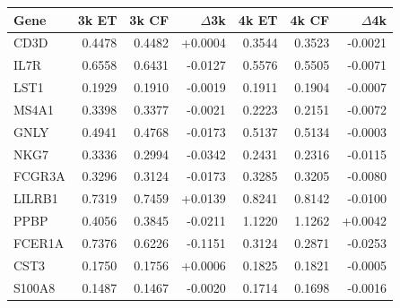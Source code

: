 \begin{tabular}{lrrrrrr}
\toprule
Gene & 3k ET & 3k CF & $\Delta$3k & 4k ET & 4k CF & $\Delta$4k\\
\midrule
CD3D & 0.4478 & 0.4482 & +0.0004 & 0.3544 & 0.3523 & -0.0021\\
IL7R & 0.6558 & 0.6431 & -0.0127 & 0.5576 & 0.5505 & -0.0071\\
LST1 & 0.1929 & 0.1910 & -0.0019 & 0.1911 & 0.1904 & -0.0007\\
MS4A1 & 0.3398 & 0.3377 & -0.0021 & 0.2223 & 0.2151 & -0.0072\\
GNLY & 0.4941 & 0.4768 & -0.0173 & 0.5137 & 0.5134 & -0.0003\\
NKG7 & 0.3336 & 0.2994 & -0.0342 & 0.2431 & 0.2316 & -0.0115\\
FCGR3A & 0.3296 & 0.3124 & -0.0173 & 0.3285 & 0.3205 & -0.0080\\
LILRB1 & 0.7319 & 0.7459 & +0.0139 & 0.8241 & 0.8142 & -0.0100\\
PPBP & 0.4056 & 0.3845 & -0.0211 & 1.1220 & 1.1262 & +0.0042\\
FCER1A & 0.7376 & 0.6226 & -0.1151 & 0.3124 & 0.2871 & -0.0253\\
CST3 & 0.1750 & 0.1756 & +0.0006 & 0.1825 & 0.1821 & -0.0005\\
S100A8 & 0.1487 & 0.1467 & -0.0020 & 0.1714 & 0.1698 & -0.0016\\
\bottomrule
\end{tabular}

